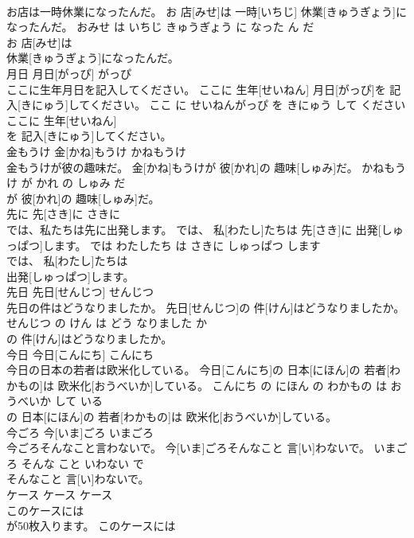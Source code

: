 \documentclass[8pt]{extreport}
\begin{document}
\begin{CJK}{UTF8}{min}
\\	お店は一時休業になったんだ。	お 店[みせ]は 一時[いちじ] 休業[きゅうぎょう]になったんだ。	おみせ は いちじ きゅうぎょう に なった ん だ	
\\	お 店[みせ]は
\\	休業[きゅうぎょう]になったんだ。			
\\	月日	月日[がっぴ]	がっぴ	
\\	ここに生年月日を記入してください。	ここに 生年[せいねん] 月日[がっぴ]を 記入[きにゅう]してください。	ここ に せいねんがっぴ を きにゅう して ください	
\\	ここに 生年[せいねん]
\\	を 記入[きにゅう]してください。			
\\	金もうけ	金[かね]もうけ	かねもうけ	
\\	金もうけが彼の趣味だ。	金[かね]もうけが 彼[かれ]の 趣味[しゅみ]だ。	かねもうけ が かれ の しゅみ だ	
\\	が 彼[かれ]の 趣味[しゅみ]だ。			
\\	先に	先[さき]に	さきに	
\\	では、私たちは先に出発します。	では、 私[わたし]たちは 先[さき]に 出発[しゅっぱつ]します。	では わたしたち は さきに しゅっぱつ します	
\\	では、 私[わたし]たちは
\\	出発[しゅっぱつ]します。			
\\	先日	先日[せんじつ]	せんじつ	
\\	先日の件はどうなりましたか。	先日[せんじつ]の 件[けん]はどうなりましたか。	せんじつ の けん は どう なりました か	
\\	の 件[けん]はどうなりましたか。			
\\	今日	今日[こんにち]	こんにち	
\\	今日の日本の若者は欧米化している。	今日[こんにち]の 日本[にほん]の 若者[わかもの]は 欧米化[おうべいか]している。	こんにち の にほん の わかもの は おうべいか して いる	
\\	の 日本[にほん]の 若者[わかもの]は 欧米化[おうべいか]している。			
\\	今ごろ	今[いま]ごろ	いまごろ	
\\	今ごろそんなこと言わないで。	今[いま]ごろそんなこと 言[い]わないで。	いまごろ そんな こと いわない で	
\\	そんなこと 言[い]わないで。			
\\	ケース	ケース	ケース	
\\	このケースには
\\	が50枚入ります。	このケースには

\end{CJK}
\end{document}
